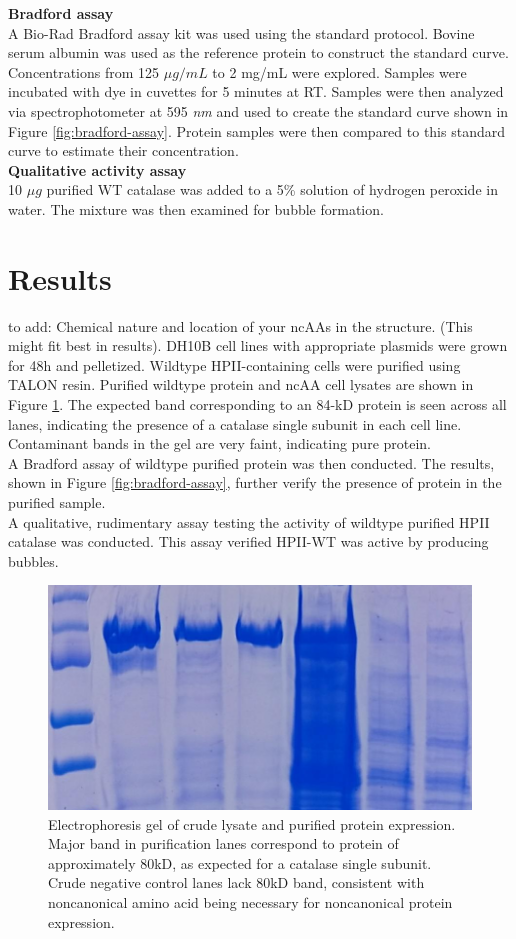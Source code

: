 \documentclass[journal=jacsat,manuscript=article]{achemso}
\begin{document}
\textbf{Bradford assay}\\
A Bio-Rad Bradford assay kit was used using the standard protocol. Bovine serum albumin was used as the reference protein to construct the standard curve. Concentrations from 125 $\mu g / mL$ to 2 mg/mL were explored. Samples were incubated with dye in cuvettes for 5 minutes at RT. Samples were then analyzed via spectrophotometer at 595 \textit{nm} and used to create the standard curve shown in Figure \ref{fig:bradford-assay}. Protein samples were then compared to this standard curve to estimate their concentration.\\

\textbf{Qualitative activity assay}\\
10 $\mu g$ purified WT catalase was added to a 5\% solution of hydrogen peroxide in water. The mixture was then examined for bubble formation.\\

\section{Results}
to add: Chemical nature and location of your ncAAs in the structure. (This might fit best in results).
DH10B cell lines with appropriate plasmids were grown for 48h and pelletized. Wildtype HPII-containing cells were purified using TALON resin. Purified wildtype protein and ncAA cell lysates are shown in Figure \ref{fig:pure-gel}. The expected band corresponding to an 84-kD protein is seen across all lanes, indicating the presence of a catalase single subunit in each cell line. Contaminant bands in the gel are very faint, indicating pure protein.\\

A Bradford assay of wildtype purified protein was then conducted. The results, shown in Figure \ref{fig:bradford-assay}, further verify the presence of protein in the purified sample.\\

A qualitative, rudimentary assay testing the activity of wildtype purified HPII catalase was conducted. This assay verified HPII-WT was active by producing bubbles.\\

\begin{figure}
\centering
\includegraphics[width=0.7\linewidth]{figures/pure-gel}
\caption{Electrophoresis gel of crude lysate and purified protein expression. Major band in purification lanes correspond to protein of approximately 80kD, as expected for a catalase single subunit. Crude negative control lanes lack 80kD band, consistent with noncanonical amino acid being necessary for noncanonical protein expression.}
\label{fig:pure-gel}
\end{figure}
\end{document}
